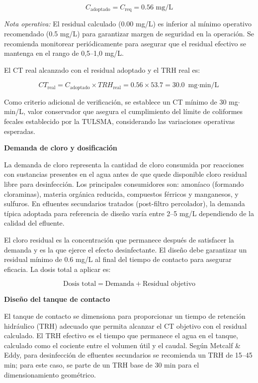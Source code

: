 \documentclass[12pt,a4paper]{article}
\begin{document}
\begin{equation}
C_{\text{adoptado}} = C_{\text{req}} = 0.56 \text{ mg/L}
\end{equation}

\textit{Nota operativa:} El residual calculado (0.00 mg/L) es inferior al mínimo operativo recomendado (0.5 mg/L) para garantizar margen de seguridad en la operación. Se recomienda monitorear periódicamente para asegurar que el residual efectivo se mantenga en el rango de 0,5--1,0 mg/L.

El CT real alcanzado con el residual adoptado y el TRH real es:

\begin{equation}
CT_{\text{real}} = C_{\text{adoptado}} \times TRH_{\text{real}} = 0.56 \times 53.7 = 30.0 \text{ mg$\cdot$min/L}
\end{equation}

Como criterio adicional de verificación, se establece un CT mínimo de 30 mg$\cdot$min/L, valor conservador que asegura el cumplimiento del límite de coliformes fecales establecido por la TULSMA, considerando las variaciones operativas esperadas.

\textbf{Demanda de cloro y dosificación}

La demanda de cloro representa la cantidad de cloro consumida por reacciones con sustancias presentes en el agua antes de que quede disponible cloro residual libre para desinfección. Los principales consumidores son: amoníaco (formando cloraminas), materia orgánica reducida, compuestos férricos y manganesos, y sulfuros. En efluentes secundarios tratados (post-filtro percolador), la demanda típica adoptada para referencia de diseño varía entre 2--5 mg/L dependiendo de la calidad del efluente.

El cloro residual es la concentración que permanece después de satisfacer la demanda y es la que ejerce el efecto desinfectante. El diseño debe garantizar un residual mínimo de 0.6 mg/L al final del tiempo de contacto para asegurar eficacia. La dosis total a aplicar es:

\begin{equation}
\text{Dosis total} = \text{Demanda} + \text{Residual objetivo}
\end{equation}

\textbf{Diseño del tanque de contacto}

El tanque de contacto se dimensiona para proporcionar un tiempo de retención hidráulico (TRH) adecuado que permita alcanzar el CT objetivo con el residual calculado. El TRH efectivo es el tiempo que permanece el agua en el tanque, calculado como el cociente entre el volumen útil y el caudal. Según Metcalf \& Eddy, para desinfección de efluentes secundarios se recomienda un TRH de 15--45 min; para este caso, se parte de un TRH base de 30 min para el dimensionamiento geométrico.
\end{document}
